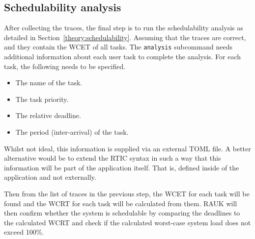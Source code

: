\subsection{Schedulability analysis}
After collecting the traces, the final step is to run the schedulability analysis as
detailed in Section~\ref{theory:schedulability}. Assuming that the traces are correct,
and they contain the WCET of all tasks. The \texttt{analysis} subcommand needs
additional information about each user task to complete the analysis. For each
task, the following needs to be specified.
\begin{itemize}
    \item The name of the task.
    \item The task priority.
    \item The relative deadline.
    \item The period (inter-arrival) of the task.
\end{itemize}
Whilst not ideal, this information is supplied via an external TOML file. A
better alternative would be to extend the RTIC syntax in such a way that this
information will be part of the application itself. That is, defined inside of
the application and not externally.

Then from the list of traces in the previous step, the WCET for each task will
be found and the WCRT for each task will be calculated from them. RAUK will
then confirm whether the system is schedulable by comparing the deadlines to
the calculated WCRT and check if the calculated worst-case system load does not
exceed 100\%.
